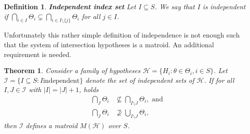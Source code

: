 \documentclass[a4paper,12pt]{article}
\newtheorem{theorem}{Theorem}
\newtheorem{definition}{Definition}
\begin{document}
\begin{definition}{\bf Independent index set}
\label{def:indep}
  Let $I \subseteq S$. We say that $I$ is independent if $\bigcap_{i
    \in I} \Theta_i \subsetneq \bigcap_{i \in I\setminus \{j\}}
  \Theta_i$ for all $j \in I$. 
\end{definition}

Unfortunately this rather simple definition of independence is not
enough such that the system of intersection hypotheses is a
matroid. An additional requirement is needed.


\begin{theorem}
  Consider a family of hypotheses $\mathcal{H} = \{H_i:\theta \in
  \Theta_i,i \in S\}$. Let $\mathscr{I} = \{I \subseteq S: I \text{
    independent}\}$ denote the set of independent sets of
  $\mathcal{H}$. If for all $I,J \in \mathscr{I}$ with $|I| = |J|+1$,
  holds 
  \begin{align}
    \label{cond:matroida}
    \bigcap_J \Theta_i &\nsubseteq \bigcap_{I\setminus J} \Theta_i,
    \text{ and} \\
    \label{cond:matroidb}
    \bigcap_{J}\Theta_i &\nsupseteq     \bigcup_{I \setminus J} \Theta_i ,
  \end{align}
  then $\mathscr{I}$ defines a matroid $M(\mathcal{H})$ over $S$.
\end{theorem}
\end{document}
